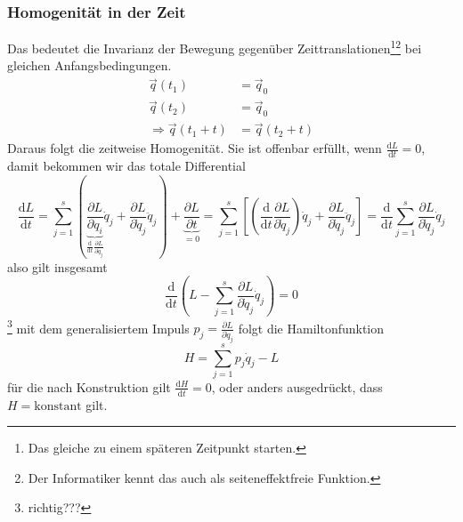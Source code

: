 \documentclass[oneside]{book}
\theoremstyle{definition}
\renewcommand{\d}{\mathrm d}
\newcommand{\dd}[1]{\frac{\d}{\d #1}}
\newcommand{\ddd}[2]{\frac{\d #1}{\d #2}}
\newcommand{\ffpartial}[2]{\frac{\partial #1}{\partial #2}}
\begin{document}
\subsubsection{Homogenität in der Zeit}
Das bedeutet die Invarianz der Bewegung gegenüber Zeittranslationen\footnote{Das gleiche zu einem späteren Zeitpunkt starten.}\footnote{Der Informatiker kennt das auch als seiteneffektfreie Funktion.} bei gleichen Anfangsbedingungen.
\begin{align*}
\vec{q}(t_1) &= \vec{q}_0\\
\vec{q}(t_2) &= \vec{q}_0\\
\Rightarrow \vec{q}(t_1 + t) &= \vec{q}(t_2 + t)
\end{align*}
Daraus folgt die zeitweise Homogenität. Sie ist offenbar erfüllt, wenn $\ddd{L}{t} = 0$, damit bekommen wir das totale Differential
$$\ddd{L}{t} = \sum_{j=1}^{s} (\underbrace{\ffpartial{L}{q_i}}_{\dd t \ffpartial{L}{\dot{q}_j}} \dot{q}_j + \ffpartial{L}{\dot{q}_j} \ddot{q}_j) + \underbrace{\ffpartial{L}{t}}_{= 0} = \sum_{j = 1}^s [ (\dd t \ffpartial{L}{\dot{q}_j}) \dot{q}_j + \ffpartial{L}{\dot{q}_j} \ddot{q}_j] = \dd t \sum_{j=1}^s \ffpartial{L}{\dot{q}_j} \dot{q}_j$$
also gilt insgesamt
$$\dd t (L - \sum_{j=1}^s \ffpartial{L}{\dot{q}_j} \dot{q}_j) = 0$$\footnote{richtig???}
mit dem generalisiertem Impuls $p_j = \ffpartial{L}{\dot{q}_j}$ folgt die Hamiltonfunktion
$$H = \sum_{j=1}^s p_j \dot{q}_j - L$$
für die nach Konstruktion gilt $\ddd{H}{t} = 0$, oder anders ausgedrückt, dass $H = \text{konstant}$ gilt.
\end{document}
